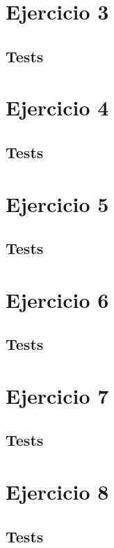 \documentclass[10pt, a4paper]{article}
\begin{document}
\section{Ejercicio 3}

\subsection{Tests}


\section{Ejercicio 4}

\subsection{Tests}


\section{Ejercicio 5}

\subsection{Tests}


\section{Ejercicio 6}

\subsection{Tests}


\section{Ejercicio 7}

\subsection{Tests}


\section{Ejercicio 8}

\subsection{Tests}

\end{document}
